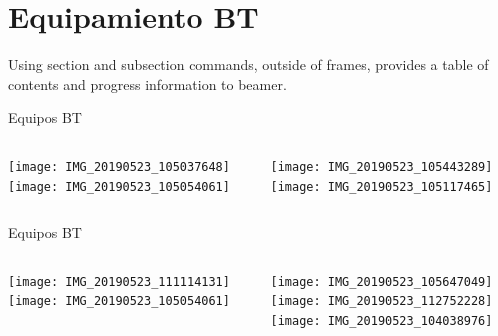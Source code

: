 \documentclass[ignorenonframetext,12pt]{beamer}
\begin{document}
\section{Equipamiento BT}
Using section and subsection commands, outside of frames, provides a table of contents and progress information to beamer.
\begin{frame}{Equipos BT}
				\begin{columns}
								\begin{column}{0.45\textwidth}
												\texttt{[image: IMG\_20190523\_105037648]} \\ 
												\texttt{[image: IMG\_20190523\_105054061]}
								\end{column}
								\begin{column}{0.45\textwidth}
												\texttt{[image: IMG\_20190523\_105443289]} \\ 
												\texttt{[image: IMG\_20190523\_105117465]}
								\end{column}
				\end{columns}


%
%
%
%
\end{frame}

\begin{frame}{Equipos BT}
				\begin{columns}
								\begin{column}{0.45\textwidth}
												\texttt{[image: IMG\_20190523\_111114131]} \\ 
												\texttt{[image: IMG\_20190523\_105054061]}
								\end{column}
								\begin{column}{0.45\textwidth}
												\texttt{[image: IMG\_20190523\_105647049]} \\ 
												\hspace{2mm}\texttt{[image: IMG\_20190523\_112752228]} \\
												\texttt{[image: IMG\_20190523\_104038976]}
								\end{column}
				\end{columns}
%
%
%
%
\end{frame}
\end{document}
